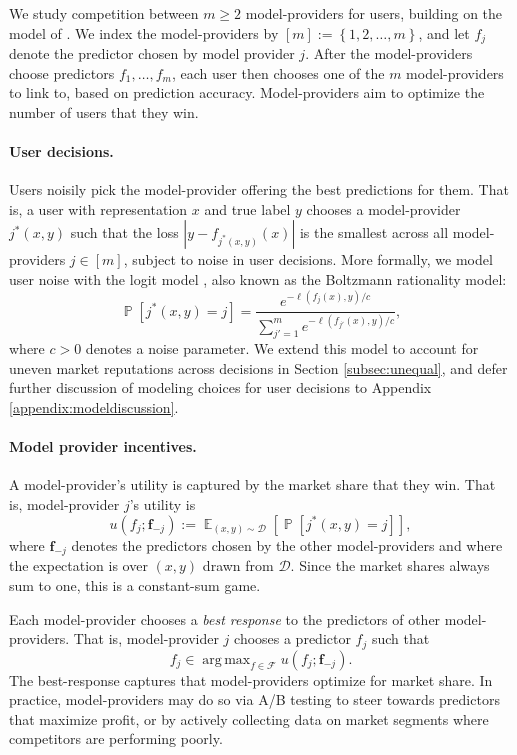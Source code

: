 \documentclass[letterpaper,11pt]{article}
\theoremstyle{plain}
\DeclareMathOperator*{\argmax}{arg\,max}
\DeclareMathOperator*{\E}{\mathbb{E}}
\DeclareMathOperator*{\Prob}{\mathbb{P}}
\begin{document}
We study competition between $m \ge 2$ model-providers for users, building on the model of \citet{BT17, BT19}. We index the model-providers by $[m] := \left\{1, 2, \ldots, m\right\}$, and let $f_j$ denote the predictor chosen by model provider $j$. After the model-providers choose predictors $f_1, \ldots, f_m$, each user then chooses one of the $m$ model-providers to link to, based on prediction accuracy. Model-providers aim to optimize the number of users that they win.


\paragraph{User decisions.} Users noisily pick the model-provider offering the best predictions for them. That is, a user with representation $x$ and true label $y$ chooses a model-provider $j^*(x,y)$ such that the loss $|y - f_{j^*(x,y)}(x)|$ is the smallest across all model-providers $j \in [m]$, subject to noise in user decisions. More formally, we model user noise with the logit model \citep{train2002discrete}, also known as the Boltzmann rationality model:
\begin{equation}
\label{eq:userchoice}
\Prob[j^*(x,y) = j] = \frac{e^{- \ell(f_j(x), y) / c}}{\sum_{j'=1}^m e^{- \ell(f_{j'}(x), y) / c}}, 
\end{equation}
where $c > 0$ denotes a noise parameter. We extend this model to account for uneven market reputations across decisions in Section \ref{subsec:unequal}, and defer further discussion of  modeling choices for user decisions to Appendix \ref{appendix:modeldiscussion}.


\paragraph{Model provider incentives.} A model-provider's utility is captured by the market share that they win. That is, model-provider $j$'s utility is 
\[u(f_j; \mathbf{f}_{-j}) := \E_{(x,y) \sim \mathcal{D}} \left[\Prob[j^*(x,y) = j] \right],\]
where $\textbf{f}_{-j}$ denotes the predictors chosen by the other model-providers and where the expectation is over $(x,y)$ drawn from $\mathcal{D}$. Since the market shares always sum to one, this is a constant-sum game. 


Each model-provider chooses a \textit{best response} to the predictors of other model-providers. That is, model-provider $j$ chooses a predictor $f_j$ such that 
\[f_j \in \argmax_{f\in \mathcal{F}} u(f_j; \mathbf{f}_{-j}). \] The best-response captures that model-providers optimize for market share. In practice, model-providers may do so via {A/B testing} to steer towards predictors that maximize profit, or by {actively collecting data} on market segments where competitors are performing poorly.
\end{document}
